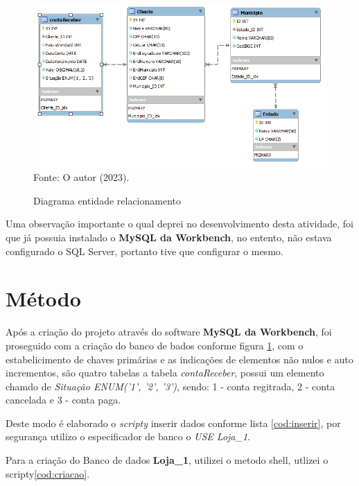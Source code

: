 \begin{figure}[h!]
  \caption{Diagrama entidade relacionamento}
  \includegraphics[width=\textwidth]{figure/diagram_EER.png}
  \label{fig:DER}
  {\fontsize{10pt}{\baselineskip}\selectfont
  Fonte: O autor (2023).}
\end{figure}

\par Uma observação importante o qual deprei no desenvolvimento desta atividade, foi que já possuia instalado o \textbf{MySQL da Workbench}, no entento, não estava configurado o SQL Server, portanto tive que configurar o mesmo.

\newpage

\section{Método}
\par Após a criação do projeto através do software \textbf{MySQL da Workbench}, foi proseguido com a criação do banco de bados conforme figura \ref{fig:DER}, com o estabelicimento de chaves primárias e as indicações de elementos não nulos e auto incrementos, são quatro tabelas a tabela \textit{contaReceber}, possui um elemento chamdo de \textit{Situação ENUM('1', '2', '3')}, sendo: 1 - conta regitrada, 2 - conta cancelada e 3 - conta paga.


\par Deste modo é elaborado o \textit{scripty} inserir dados conforme lista \ref{cod:inserir}, por segurança utilizo o especificador de banco o \textit{USE Loja\_1}.
\par Para a criação do Banco de dados \textbf{Loja\_1}, utilizei o metodo shell, utlizei o scripty\ref{cod:criacao}.



